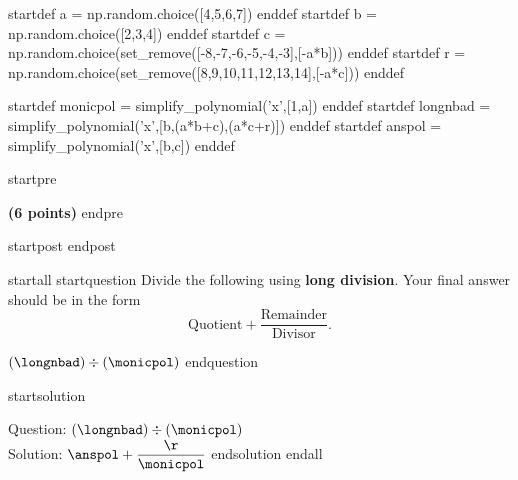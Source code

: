 startdef a = np.random.choice([4,5,6,7]) enddef
startdef b = np.random.choice([2,3,4]) enddef
startdef c = np.random.choice(set_remove([-8,-7,-6,-5,-4,-3],[-a*b])) enddef
startdef r = np.random.choice(set_remove([8,9,10,11,12,13,14],[-a*c])) enddef

startdef monicpol = simplify_polynomial('x',[1,a]) enddef
startdef longnbad = simplify_polynomial('x',[b,(a*b+c),(a*c+r)]) enddef
startdef anspol = simplify_polynomial('x',[b,c]) enddef


startpre
\item {\bf (6 points)} 
endpre

startpost
\vfill  \vfill \vfill
endpost


startall
startquestion Divide the following using {\bf long division}. Your final answer should be in the form $$ \text{Quotient} + \dfrac{\text{Remainder}}{\text{Divisor}}.$$

\vspace{3mm}

$(\longnbad) \div (\monicpol)$
endquestion 

startsolution
\item Question: $(\longnbad) \div (\monicpol)$   \\
Solution: $\anspol + \dfrac{\r}{\monicpol}$
endsolution
endall

